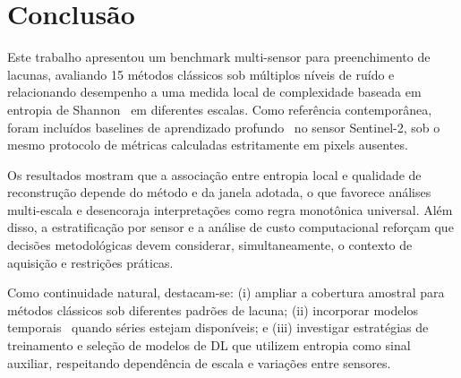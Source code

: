 \section{Conclusão}
\label{sec:conclusion}

Este trabalho apresentou um benchmark multi-sensor para preenchimento de
lacunas, avaliando 15 métodos clássicos sob múltiplos níveis de ruído e
relacionando desempenho a uma medida local de complexidade baseada em entropia
de Shannon~\cite{shannon1948mathematical} em diferentes escalas. Como referência
contemporânea, foram incluídos baselines de aprendizado
profundo~\cite{ronneberger2015unet,goodfellow2014generative,kingma2014auto,dosovitskiy2021image}
no sensor Sentinel-2, sob o mesmo protocolo de métricas calculadas estritamente
em pixels ausentes.

Os resultados mostram que a associação entre entropia local e qualidade de
reconstrução depende do método e da janela adotada, o que favorece análises
multi-escala e desencoraja interpretações como regra monotônica universal.
Além disso, a estratificação por sensor e a análise de custo computacional
reforçam que decisões metodológicas devem considerar, simultaneamente, o
contexto de aquisição e restrições práticas.

Como continuidade natural, destacam-se: (i) ampliar a cobertura amostral para
métodos clássicos sob diferentes padrões de lacuna; (ii) incorporar modelos
temporais~\cite{beckers2003eof,alvera2005reconstruction} quando séries estejam
disponíveis; e (iii) investigar estratégias de treinamento e seleção de modelos
de \gls{DL} que utilizem entropia como sinal auxiliar, respeitando dependência
de escala e variações entre sensores.
